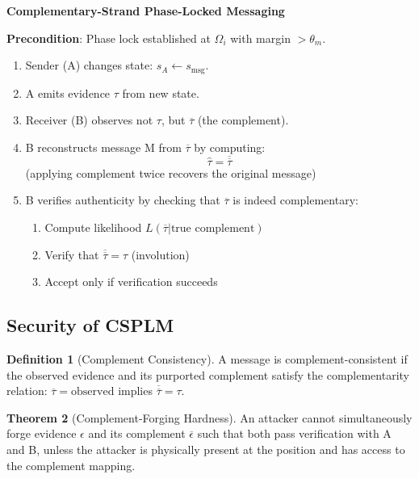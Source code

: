 \documentclass[11pt,a4paper]{article}
\theoremstyle{definition}
\newtheorem{definition}{Definition}[section]
\newtheorem{theorem}[definition]{Theorem}
\newcommand{\comp}[1]{\overline{#1}}
\begin{document}
\begin{algorithm}
\textbf{Complementary-Strand Phase-Locked Messaging}

\textbf{Precondition}: Phase lock established at $\Omega_i$ with margin $> \theta_m$.

\begin{enumerate}
\item Sender (A) changes state: $s_A \leftarrow s_{\text{msg}}$.
\item A emits evidence $\tau$ from new state.
\item Receiver (B) observes not $\tau$, but $\comp{\tau}$ (the complement).
\item B reconstructs message M from $\comp{\tau}$ by computing:
  \[
  \hat{\tau} = \comp{\comp{\tau}}
  \]
  (applying complement twice recovers the original message)
\item B verifies authenticity by checking that $\comp{\tau}$ is indeed complementary:
  \begin{enumerate}
  \item Compute likelihood $L(\comp{\tau} | \text{true complement})$
  \item Verify that $\comp{\comp{\tau}} = \tau$ (involution)
  \item Accept only if verification succeeds
  \end{enumerate}
\end{enumerate}
\end{algorithm}

\subsection{Security of CSPLM}

\begin{definition}[Complement Consistency]
A message is complement-consistent if the observed evidence and its purported complement satisfy the complementarity relation: $\comp{\tau} = \text{observed}$ implies $\comp{\comp{\tau}} = \tau$.
\end{definition}

\begin{theorem}[Complement-Forging Hardness]
An attacker cannot simultaneously forge evidence $\epsilon$ and its complement $\comp{\epsilon}$ such that both pass verification with A and B, unless the attacker is physically present at the position and has access to the complement mapping.
\end{theorem}
\end{document}
